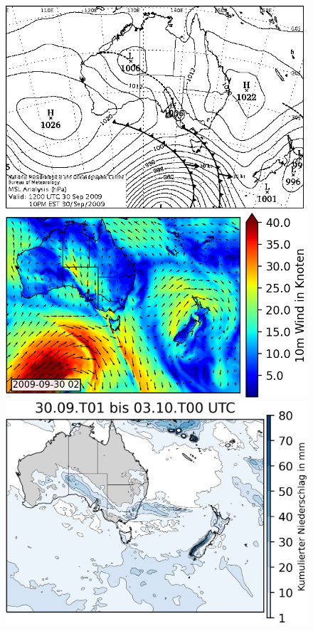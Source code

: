 \documentclass[12pt,a4paper,onecolumn]{scrartcl}
\begin{document}
\begin{figure}
	\begin{minipage}[c]{0.3\textwidth}
		\includegraphics[width=\textwidth]{bilder/20090930T12_msl.png}
	\end{minipage}\hfill
	\begin{minipage}[c]{0.35\textwidth}
		\includegraphics[width=\textwidth]{bilder/wind_october_small.png}
	\end{minipage}\hfill
	\begin{minipage}[c]{0.33\textwidth}
		\includegraphics[width=\textwidth]{bilder/rain_october_small.png}

\end{minipage}
\end{figure}
\end{document}
